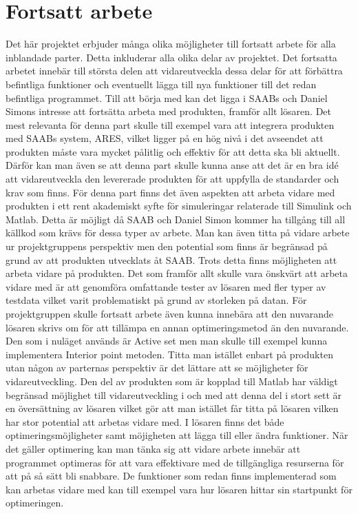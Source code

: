 \section{Fortsatt arbete}
Det här projektet erbjuder många olika möjligheter till fortsatt arbete för alla inblandade parter. Detta inkluderar alla olika delar av projektet. Det fortsatta arbetet innebär till största delen att vidareutveckla dessa delar för att förbättra befintliga funktioner och eventuellt lägga till nya funktioner till det redan befintliga programmet. 
\newline \newline
Till att börja med kan det ligga i SAABs och Daniel Simons intresse att fortsätta arbeta med produkten, framför allt lösaren. Det mest relevanta för denna part skulle till exempel vara att integrera produkten med SAABs system, ARES, vilket ligger på en hög nivå i det avseendet att produkten måste vara mycket pålitlig och effektiv för att detta ska bli aktuellt. Därför kan man även se att denna part skulle kunna anse att det är en bra idé att vidareutveckla den levererade produkten för att uppfylla de standarder och krav som finns. För denna part finns det även aspekten att arbeta vidare med produkten i ett rent akademiskt syfte för simuleringar relaterade till Simulink och Matlab. Detta är möjligt då SAAB och Daniel Simon kommer ha tillgång till all källkod som krävs för dessa typer av arbete.
\newline \newline
Man kan även titta på vidare arbete ur projektgruppens perspektiv men den potential som finns är begränsad på grund av att produkten utvecklats åt SAAB. Trots detta finns möjligheten att arbeta vidare på produkten. Det som framför allt skulle vara önskvärt att arbeta vidare med är att genomföra omfattande tester av lösaren med fler typer av testdata vilket varit problematiskt på grund av storleken på datan. För projektgruppen skulle fortsatt arbete även kunna innebära att den nuvarande lösaren skrivs om för att tillämpa en annan optimeringsmetod än den nuvarande. Den som i nuläget används är Active set men man skulle till exempel kunna implementera Interior point metoden.
\newline \newline
Titta man istället enbart på produkten utan någon av parternas perspektiv är det lättare att se möjligheter för vidareutveckling. Den del av produkten som är kopplad till Matlab har väldigt begränsad möjlighet till vidareutveckling i och med att denna del i stort sett är en översättning av lösaren vilket gör att man istället får titta på lösaren vilken har stor potential att arbetas vidare med. I lösaren finns det både optimeringsmöjligheter samt möjigheten att lägga till eller ändra funktioner. När det gäller optimering kan man tänka sig att vidare arbete innebär att programmet optimeras för att vara effektivare med de tillgängliga resurserna för att på så sätt bli snabbare. De funktioner som redan finns implementerad som kan arbetas vidare med kan till exempel vara hur lösaren hittar sin startpunkt för optimeringen.

